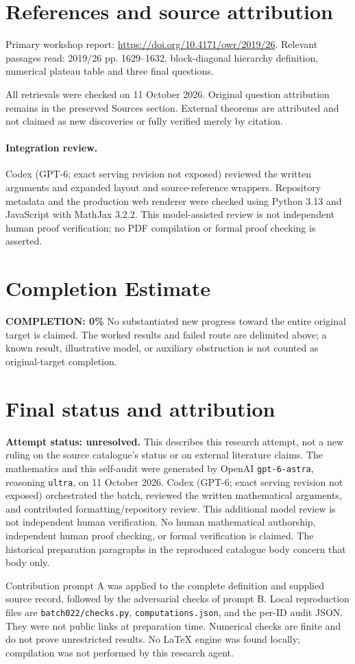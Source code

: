 \documentclass[11pt]{article}
\begin{document}
\section{References and source attribution}
Primary workshop report: \url{https://doi.org/10.4171/owr/2019/26}. Relevant passages read: 2019/26 pp. 1629--1632, block-diagonal hierarchy definition, numerical plateau table and three final questions.

All retrievals were checked on 11 October 2026. Original question attribution remains in the preserved Sources section. External theorems are attributed and not claimed as new discoveries or fully verified merely by citation.


\paragraph{Integration review.} Codex (GPT-6; exact serving revision not exposed) reviewed the written arguments and expanded layout and source-reference wrappers. Repository metadata and the production web renderer were checked using Python 3.13 and JavaScript with MathJax 3.2.2. This model-assisted review is not independent human proof verification; no PDF compilation or formal proof checking is asserted.

\section{Completion Estimate}
\noindent\textbf{COMPLETION: 0\%}
No substantiated new progress toward the entire original target is claimed. The worked results and failed route are delimited above; a known result, illustrative model, or auxiliary obstruction is not counted as original-target completion.

\section{Final status and attribution}
\textbf{Attempt status: unresolved.} This describes this research attempt, not a new ruling on the source catalogue's status or on external literature claims.
The mathematics and this self-audit were generated by OpenAI \texttt{gpt-6-astra}, reasoning \texttt{ultra}, on 11 October 2026. Codex (GPT-6; exact serving revision not exposed) orchestrated the batch, reviewed the written mathematical arguments, and contributed formatting/repository review. This additional model review is not independent human verification. No human mathematical authorship, independent human proof checking, or formal verification is claimed. The historical preparation paragraphs in the reproduced catalogue body concern that body only.

Contribution prompt A was applied to the complete definition and supplied source record, followed by the adversarial checks of prompt B. Local reproduction files are \texttt{batch022/checks.py}, \texttt{computations.json}, and the per-ID audit JSON. They were not public links at preparation time. Numerical checks are finite and do not prove unrestricted results. No LaTeX engine was found locally; compilation was not performed by this research agent.
\end{document}

